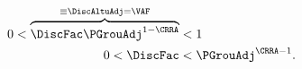   \begin{equation}\label{eq:FVAC}
    \begin{split}
      0 < \overbrace{\DiscFac \PGrouAdj^{1-\CRRA} }^{\equiv \DiscAltuAdj = \text{\VAF}}  & < 1
      \\ 0 < \DiscFac  & < \PGrouAdj^{\CRRA-1} .
    \end{split}
  \end{equation}
